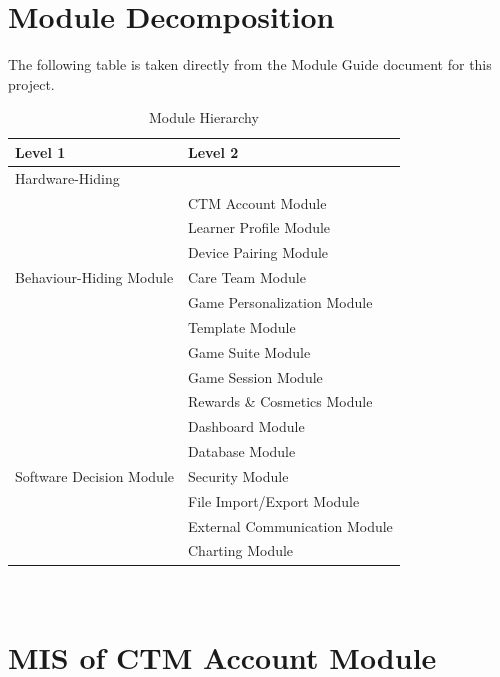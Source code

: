 \documentclass[12pt, titlepage]{article}
\begin{document}
\section{Module Decomposition}
\label{SecModuleDecomposition}

The following table is taken directly from the Module Guide document for this project.

\begin{table}[h!]
\centering
\begin{tabular}{p{} p{}}
\toprule
\textbf{Level 1} & \textbf{Level 2}\\
\midrule

{Hardware-Hiding} & ~ \\
\midrule

\multirow{7}{0.3\textwidth}{Behaviour-Hiding Module}
& CTM Account Module\\
& Learner Profile Module\\
& Device Pairing Module\\
& Care Team Module\\
& Game Personalization Module\\
& Template Module\\ 
& Game Suite Module\\
& Game Session Module\\
& Rewards \& Cosmetics Module\\
& Dashboard Module\\
\midrule

\multirow{3}{0.3\textwidth}{Software Decision Module}
& Database Module\\
& Security Module\\
& File Import/Export Module\\
& External Communication Module\\
& Charting Module\\
\bottomrule

\end{tabular}
\caption{Module Hierarchy}
\label{TblMH}
\end{table}

\newpage
~\newpage

\section{MIS of CTM Account Module} \label{mis:CTMAccount}
\end{document}
